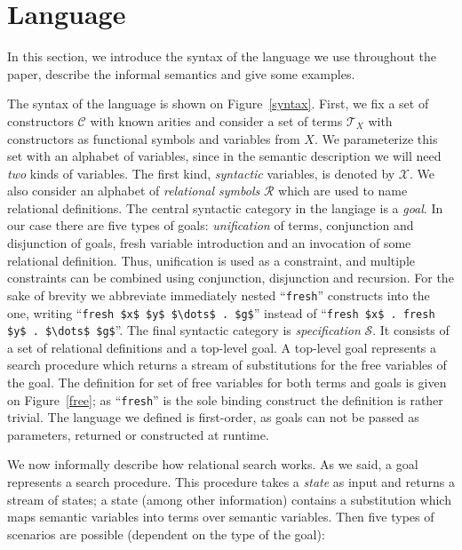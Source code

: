 \section{Language}

In this section, we introduce the syntax of the language we use throughout the paper, describe the informal semantics and give some examples.

The syntax of the language is shown on Figure~\ref{syntax}. First, we fix a set of constructors $\mathcal{C}$ with known arities and consider
a set of terms $\mathcal{T}_X$ with constructors as functional symbols and variables from $X$. We parameterize this set with an alphabet of
variables, since in the semantic description we will need \emph{two} kinds of variables. The first kind, \emph{syntactic} variables, is denoted
by $\mathcal{X}$. We also consider an alphabet of \emph{relational symbols} $\mathcal{R}$ which are used to name relational definitions.
The central syntactic category in the langiage is a \emph{goal}. In our case there are five types of goals: \emph{unification} of terms,
conjunction and disjunction of goals, fresh variable introduction and an invocation of some relational definition. Thus, unification is used
as a constraint, and multiple constraints can be combined using conjunction, disjunction and recursion. For the sake of brevity we
abbreviate immediately nested ``\lstinline|fresh|'' constructs into the one, writing ``\lstinline|fresh $x$ $y$ $\dots$ . $g$|'' instead of
``\lstinline|fresh $x$ . fresh $y$ . $\dots$ $g$|''. The final syntactic category is \emph{specification} $\mathcal{S}$. It consists of a set
of relational definitions and a top-level goal. A top-level goal represents a search procedure which returns a stream of substitutions for
the free variables of the goal. The definition for set of free variables for both terms and goals is given on Figure~\ref{free}; as ``\lstinline|fresh|''
is the sole binding construct the definition is rather trivial. The language we defined is first-order, as goals can not be passed as parameters,
returned or constructed at runtime.

We now informally describe how relational search works. As we said, a goal represents a search procedure. This procedure takes a \emph{state} as input and returns a
stream of states; a state (among other information) contains a substitution which maps semantic variables into terms over semantic variables. Then five types of
scenarios are possible (dependent on the type of the goal):

